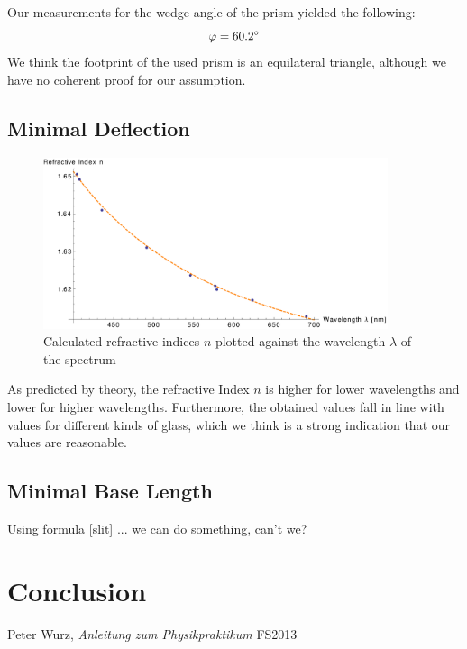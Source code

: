 \documentclass{scrreprt}
\renewcommand{\phi}{\varphi}
\begin{document}
Our measurements for the wedge angle of the prism yielded the following:
\begin{equation}
	\phi = \ang{60.2}
\notag
\end{equation}
We think the footprint of the used prism is an equilateral triangle, although we have no coherent proof for our assumption.

\subsection{Minimal Deflection}
\begin{figure}[H]
	\centering
  \includegraphics[width=0.9\textwidth]{diag/meas_and_fit.pdf}
	\caption{Calculated refractive indices $n$ plotted against the wavelength $\lambda$ of the spectrum}
	\label{fig:meas_and_fit}
\end{figure}
As predicted by theory, the refractive Index $n$ is higher for lower wavelengths and lower for higher wavelengths. Furthermore, the obtained values fall in line with values for different kinds of glass, which we think is a strong indication that our values are reasonable.

\subsection{Minimal Base Length}

Using formula \ref{slit} ... we can do something, can't we?


\section{Conclusion}

\begin{thebibliography}{9}

  Peter Wurz,
  \emph{Anleitung zum Physikpraktikum}
  FS2013

\end{thebibliography}
\end{document}
